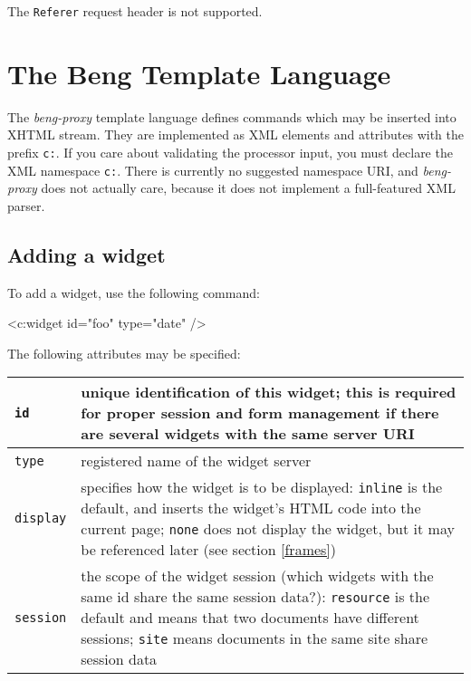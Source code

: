 \documentclass[a4paper,12pt]{article}
\begin{document}
The \texttt{Referer} request header is not supported.


\section{The Beng Template Language}
\label{processor}

The \emph{beng-proxy} template language defines commands which may be
inserted into XHTML stream.  They are implemented as XML elements and
attributes with the prefix \texttt{c:}.  If you care about validating
the processor input, you must declare the XML namespace \texttt{c:}.
There is currently no suggested namespace URI, and \emph{beng-proxy}
does not actually care, because it does not implement a full-featured
XML parser.

\subsection{Adding a widget}

To add a widget, use the following command:

\begin{verbatim*}
<c:widget id="foo" type="date" />
\end{verbatim*}

The following attributes may be specified:

\begin{longtable}{|l|p{8cm}|}
\hline
\texttt{id} & unique identification of this widget; this is required
for proper session and form management if there are several widgets
with the same server URI \\
\hline
\texttt{type} & registered name of the widget server \\

\hline

\texttt{display} & specifies how the widget is to be displayed:
\texttt{inline} is the default, and inserts the widget's HTML code
into the current page; \texttt{none} does not display the widget, but
it may be referenced later (see section \ref{frames}) \\

\hline
\texttt{session} & the scope of the widget session (which widgets with
the same id share the same session data?): \texttt{resource} is the
default and means that two documents have different sessions;
\texttt{site} means documents in the same site share session data \\

\hline
\end{longtable}
\end{document}
